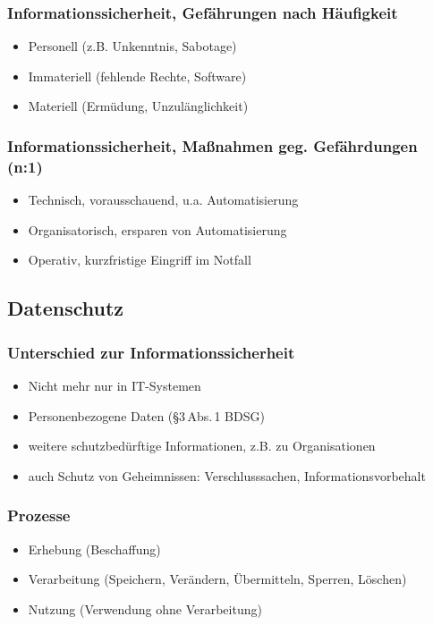 \documentclass[12pt]{beamer}
\begin{document}
\begin{frame}
	\frametitle{Informationssicherheit, Gefährungen nach Häufigkeit}
	\begin{itemize}
		\item Personell (z.B. Unkenntnis, Sabotage)
		\item Immateriell (fehlende Rechte, Software)
		\item Materiell (Ermüdung, Unzulänglichkeit)
	\end{itemize}
\end{frame}

\begin{frame}
	\frametitle{Informationssicherheit, Maßnahmen geg. Gefährdungen (n:1)}
	\begin{itemize}
		\item Technisch, vorausschauend, u.a. Automatisierung
		\item Organisatorisch, ersparen von Automatisierung
		\item Operativ, kurzfristige Eingriff im Notfall
	\end{itemize}
\end{frame}

\subsection{Datenschutz}

\begin{frame}
	\frametitle{Unterschied zur Informationssicherheit}
	\begin{itemize}
		\item Nicht mehr nur in IT-Systemen
		\item Personenbezogene Daten (§3\,Abs.\,1 BDSG)
		\item weitere schutzbedürftige Informationen, z.B. zu Organisationen
		\item auch Schutz von Geheimnissen: Verschlusssachen, Informationsvorbehalt
	\end{itemize}
\end{frame}

\begin{frame}
	\frametitle{Prozesse}
	\begin{itemize}
		\item Erhebung (Beschaffung)
		\item Verarbeitung (Speichern, Verändern, Übermitteln, Sperren, Löschen)
		\item Nutzung (Verwendung ohne Verarbeitung)
	\end{itemize}
\end{frame}
\end{document}
